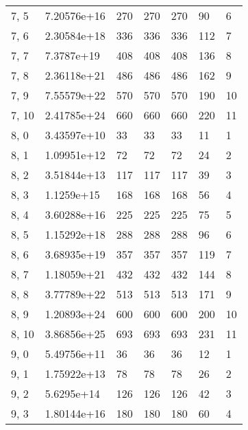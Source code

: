 \begin{table}
\begin{tabular}{lllllll}
7, 5   &  7.20576e+16 &         270 &       270 &         270 &       90 &     6 \\
7, 6   &  2.30584e+18 &         336 &       336 &         336 &      112 &     7 \\
7, 7   &   7.3787e+19 &         408 &       408 &         408 &      136 &     8 \\
7, 8   &  2.36118e+21 &         486 &       486 &         486 &      162 &     9 \\
7, 9   &  7.55579e+22 &         570 &       570 &         570 &      190 &    10 \\
7, 10  &  2.41785e+24 &         660 &       660 &         660 &      220 &    11 \\
8, 0   &  3.43597e+10 &          33 &        33 &          33 &       11 &     1 \\
8, 1   &  1.09951e+12 &          72 &        72 &          72 &       24 &     2 \\
8, 2   &  3.51844e+13 &         117 &       117 &         117 &       39 &     3 \\
8, 3   &   1.1259e+15 &         168 &       168 &         168 &       56 &     4 \\
8, 4   &  3.60288e+16 &         225 &       225 &         225 &       75 &     5 \\
8, 5   &  1.15292e+18 &         288 &       288 &         288 &       96 &     6 \\
8, 6   &  3.68935e+19 &         357 &       357 &         357 &      119 &     7 \\
8, 7   &  1.18059e+21 &         432 &       432 &         432 &      144 &     8 \\
8, 8   &  3.77789e+22 &         513 &       513 &         513 &      171 &     9 \\
8, 9   &  1.20893e+24 &         600 &       600 &         600 &      200 &    10 \\
8, 10  &  3.86856e+25 &         693 &       693 &         693 &      231 &    11 \\
9, 0   &  5.49756e+11 &          36 &        36 &          36 &       12 &     1 \\
9, 1   &  1.75922e+13 &          78 &        78 &          78 &       26 &     2 \\
9, 2   &   5.6295e+14 &         126 &       126 &         126 &       42 &     3 \\
9, 3   &  1.80144e+16 &         180 &       180 &         180 &       60 &     4 \\

\end{tabular}
\end{table}
